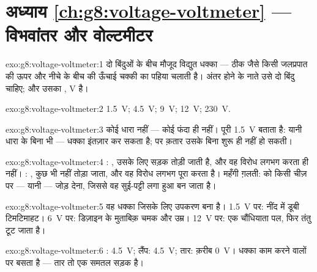 \section*{अध्याय \ref{ch:g8:voltage-voltmeter} --- विभवांतर और वोल्टमीटर}

\begin{solution}{exo:g8:voltage-voltmeter:1}
दो बिंदुओं के बीच मौजूद विद्युत धक्का --- ठीक जैसे किसी जलप्रपात की
ऊपर और नीचे के बीच की ऊँचाई चक्की का पहिया चलाती है। अंतर होने के नाते
उसे दो बिंदु चाहिए; और उसका  , \unit{V} है।
\end{solution}

\begin{solution}{exo:g8:voltage-voltmeter:2}
\qty{1.5}{V}; \qty{4.5}{V}; \qty{9}{V}; \qty{12}{V};
\qty{230}{V}.
\end{solution}

\begin{solution}{exo:g8:voltage-voltmeter:3}
कोई धारा नहीं --- कोई फंदा ही नहीं।  पूरी \qty{1.5}{V} बताता
है: यानी धारा के बिना भी  --- धक्का इंतज़ार कर सकता है; पर
क़तार उसके बिना शुरू ही नहीं हो सकती।
\end{solution}

\begin{solution}{exo:g8:voltage-voltmeter:4}
: , उसके लिए सड़क तोड़ी जाती है, और वह विरोध लगभग करता
ही नहीं। : , कुछ भी नहीं तोड़ा जाता, और वह विरोध
लगभग पूरा करता है। महँगी ग़लती:  को किसी चीज़ पर --- यानी  --- जोड़ देना, जिससे वह सुई-पट्टी लगा हुआ  बन जाता है।
\end{solution}

\begin{solution}{exo:g8:voltage-voltmeter:5}
वह धक्का जिसके लिए उपकरण बना है। \qty{1.5}{V} पर: नींद में डूबी
टिमटिमाहट। \qty{6}{V} पर: डिज़ाइन के मुताबिक़ चमक और उम्र।
\qty{12}{V} पर: एक चौंधियाता पल, फिर तंतु टूट जाता है।
\end{solution}

\begin{solution}{exo:g8:voltage-voltmeter:6}
: \qty{4.5}{V}; लैंप: \qty{4.5}{V}; तार: क़रीब \qty{0}{V}। धक्का
काम करने वालों पर बसता है --- तार तो एक समतल सड़क है।
\end{solution}

